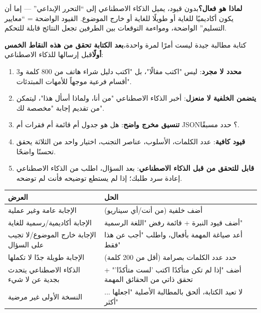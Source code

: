 \textbf{لماذا هو فعال؟}بدون قيود، يميل الذكاء الاصطناعي إلى “التحرر الإبداعي” — إما أن يكون أكاديميًا للغاية أو طويلًا للغاية أو خارج الموضوع. القيود الواضحة = “معايير التسليم” الواضحة، ومواءمة التوقعات بين الطرفين تجعل النتائج قابلة للتحكم.


كتابة مطالبة جيدة ليست أمرًا لمرة واحدة،\textbf{بعد الكتابة تحقق من هذه النقاط الخمس أولًا}قبل إرسالها للذكاء الاصطناعي:

\begin{enumerate}
  \item \textbf{محدد لا مجرد}: ليس "اكتب مقالًا"، بل "اكتب دليل شراء هاتف من 800 كلمة و3 أقسام فرعية موجهاً للأمهات المبتدئات".
  \item \textbf{يتضمن الخلفية لا منعزل}: أخبر الذكاء الاصطناعي "من أنا، ولماذا أسأل هذا"، ليتمكن من تقديم إجابة "مخصصة لك".
  \item \textbf{تنسيق مخرج واضح}: هل هو جدول أم قائمة أم فقرات أم JSON؟ حدد مسبقًا.
  \item \textbf{قيود كافية}: عدد الكلمات، الأسلوب، عناصر التجنب، اختيار واحد من الثلاثة يحقق تحسنًا واضحًا.
  \item \textbf{قابل للتحقق من قبل الذكاء الاصطناعي}: بعد السؤال، اطلب من الذكاء الاصطناعي إعادة سرد طلبك؛ إذا لم يستطع توضيحه فأنت لم توضحه.
\end{enumerate}


\begin{center}
\begin{tabularx}{\linewidth}{|X|X|}
\hline
\textbf{العرض} & \textbf{الحل} \tabularnewline
\hline
الإجابة عامة وغير عملية & أضف خلفية (من أنت/أي سيناريو) \tabularnewline
الإجابة أكاديمية/رسمية للغاية & أضف قيود النبرة + قائمة رفض "اللغة الرسمية" \tabularnewline
الإجابة خارج الموضوع/لا تجيب على السؤال & أعد صياغة المهمة بأفعال، واطلب "أجب عن هذا فقط" \tabularnewline
الإجابة طويلة جدًا لا تكملها & حدد عدد الكلمات بصرامة (أقل من 200 كلمة) \tabularnewline
الذكاء الاصطناعي يتحدث بجدية عن لا شيء & أضف "إذا لم تكن متأكدًا اكتب 'لست متأكدًا'" + تحقق ذاتي من الحقائق المهمة \tabularnewline
النسخة الأولى غير مرضية & لا تعيد الكتابة، ألحق بالمطالبة الأصلية "اجعلها ... أكثر" \tabularnewline
\hline
\end{tabularx}
\end{center}


